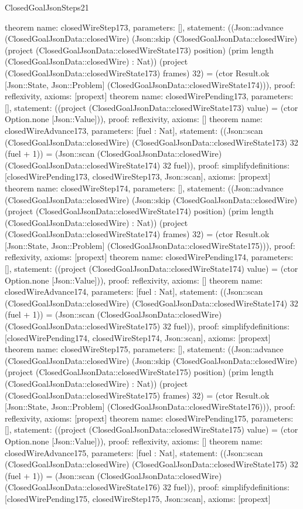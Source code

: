 \begin{lexlean}{ClosedGoalJsonSteps21}
\begin{semanticmodule}
{}
theorem{
 name: closedWireStep173, parameters: [],
 statement: ((Json::advance (ClosedGoalJsonData::closedWire) (Json::skip (ClosedGoalJsonData::closedWire) (project (ClosedGoalJsonData::closedWireState173) position) (prim length (ClosedGoalJsonData::closedWire) : Nat)) (project (ClosedGoalJsonData::closedWireState173) frames) 32) = (ctor Result.ok [Json::State, Json::Problem] (ClosedGoalJsonData::closedWireState174))), proof: reflexivity{}, axioms: [propext]
}
theorem{
 name: closedWirePending173, parameters: [],
 statement: ((project (ClosedGoalJsonData::closedWireState173) value) = (ctor Option.none [Json::Value])), proof: reflexivity{}, axioms: []
}
theorem{
 name: closedWireAdvance173, parameters: [fuel : Nat],
 statement: ((Json::scan (ClosedGoalJsonData::closedWire) (ClosedGoalJsonData::closedWireState173) 32 (fuel + 1)) = (Json::scan (ClosedGoalJsonData::closedWire) (ClosedGoalJsonData::closedWireState174) 32 fuel)), proof: simplify{definitions: [closedWirePending173, closedWireStep173, Json::scan]}, axioms: [propext]
}
theorem{
 name: closedWireStep174, parameters: [],
 statement: ((Json::advance (ClosedGoalJsonData::closedWire) (Json::skip (ClosedGoalJsonData::closedWire) (project (ClosedGoalJsonData::closedWireState174) position) (prim length (ClosedGoalJsonData::closedWire) : Nat)) (project (ClosedGoalJsonData::closedWireState174) frames) 32) = (ctor Result.ok [Json::State, Json::Problem] (ClosedGoalJsonData::closedWireState175))), proof: reflexivity{}, axioms: [propext]
}
theorem{
 name: closedWirePending174, parameters: [],
 statement: ((project (ClosedGoalJsonData::closedWireState174) value) = (ctor Option.none [Json::Value])), proof: reflexivity{}, axioms: []
}
theorem{
 name: closedWireAdvance174, parameters: [fuel : Nat],
 statement: ((Json::scan (ClosedGoalJsonData::closedWire) (ClosedGoalJsonData::closedWireState174) 32 (fuel + 1)) = (Json::scan (ClosedGoalJsonData::closedWire) (ClosedGoalJsonData::closedWireState175) 32 fuel)), proof: simplify{definitions: [closedWirePending174, closedWireStep174, Json::scan]}, axioms: [propext]
}
theorem{
 name: closedWireStep175, parameters: [],
 statement: ((Json::advance (ClosedGoalJsonData::closedWire) (Json::skip (ClosedGoalJsonData::closedWire) (project (ClosedGoalJsonData::closedWireState175) position) (prim length (ClosedGoalJsonData::closedWire) : Nat)) (project (ClosedGoalJsonData::closedWireState175) frames) 32) = (ctor Result.ok [Json::State, Json::Problem] (ClosedGoalJsonData::closedWireState176))), proof: reflexivity{}, axioms: [propext]
}
theorem{
 name: closedWirePending175, parameters: [],
 statement: ((project (ClosedGoalJsonData::closedWireState175) value) = (ctor Option.none [Json::Value])), proof: reflexivity{}, axioms: []
}
theorem{
 name: closedWireAdvance175, parameters: [fuel : Nat],
 statement: ((Json::scan (ClosedGoalJsonData::closedWire) (ClosedGoalJsonData::closedWireState175) 32 (fuel + 1)) = (Json::scan (ClosedGoalJsonData::closedWire) (ClosedGoalJsonData::closedWireState176) 32 fuel)), proof: simplify{definitions: [closedWirePending175, closedWireStep175, Json::scan]}, axioms: [propext]
}
\end{semanticmodule}
\end{lexlean}
